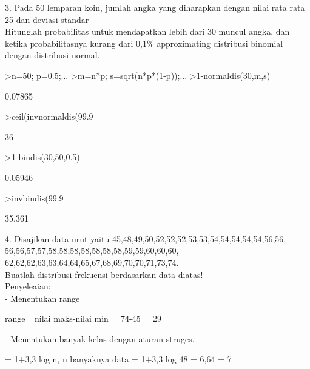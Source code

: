 \documentclass[12pt,arial,letterpaper]{book}
\begin{document}
\begin{eulernootebook}
\begin{eulercomment}
\begin{eulercomment}
\begin{eulernootebook}
\begin{eulercomment}
\begin{eulercomment}
\begin{eulercomment}
\begin{eulercomment}
\begin{eulercomment}
\begin{eulercomment}
\begin{eulercomment}
\begin{eulercomment}
\begin{eulercomment}
\begin{eulercomment}
\begin{eulercomment}
\begin{eulercomment}
\begin{eulercomment}
\begin{eulercomment}
3. Pada 50 lemparan koin, jumlah angka yang diharapkan dengan nilai
rata rata 25 dan deviasi standar\\
Hitunglah probabilitas untuk mendapatkan lebih dari 30 muncul angka,
dan ketika probabilitasnya kurang dari 0,1\% approximating distribusi
binomial dengan distribusi normal.
\end{eulercomment}
\begin{eulerprompt}
>n=50; p=0.5;...
>m=n*p; s=sqrt(n*p*(1-p));...
>1-normaldis(30,m,s)
\end{eulerprompt}
\begin{euleroutput}
  0.07865
\end{euleroutput}
\begin{eulerprompt}
>ceil(invnormaldis(99.9%
\end{eulerprompt}
\begin{euleroutput}
  36
\end{euleroutput}
\begin{eulerprompt}
>1-bindis(30,50,0.5)
\end{eulerprompt}
\begin{euleroutput}
  0.05946
\end{euleroutput}
\begin{eulerprompt}
>invbindis(99.9%
\end{eulerprompt}
\begin{euleroutput}
  35.361
\end{euleroutput}
\begin{eulercomment}
4. Disajikan data urut yaitu
45,48,49,50,52,52,52,53,53,54,54,54,54,54,56,56,
56,56,57,57,58,58,58,58,58,58,58,59,59,60,60,60,
62,62,62,63,63,64,64,65,67,68,69,70,70,71,73,74.\\
Buatlah distribusi frekuensi berdasarkan data diatas!\\
Penyeleaian:\\
- Menentukan range\\
\end{eulercomment}
\begin{eulerttcomment}
  range= nilai maks-nilai min
       = 74-45
       = 29
\end{eulerttcomment}
\begin{eulercomment}
- Menentukan banyak kelas dengan aturan struges.\\
\end{eulercomment}
\begin{eulerttcomment}
  = 1+3,3 log n, n banyaknya data
  = 1+3,3 log 48
  = 6,64
  = 7
\end{eulerttcomment}

\end{eulercomment}
\end{eulercomment}
\end{eulercomment}
\end{eulercomment}
\end{eulercomment}
\end{eulercomment}
\end{eulercomment}
\end{eulercomment}
\end{eulercomment}
\end{eulercomment}
\end{eulercomment}
\end{eulercomment}
\end{eulercomment}
\end{eulernootebook}
\end{eulercomment}
\end{eulercomment}
\end{eulernootebook}
\end{document}
